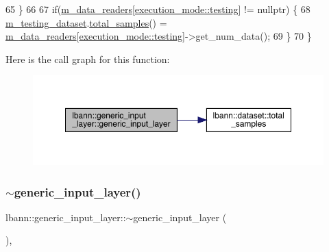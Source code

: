 \begin{DoxyCode}
65     \}
66 
67     \textcolor{keywordflow}{if}(\hyperlink{classlbann_1_1generic__input__layer_a6bc18860c02beed0252ea3cc87bc48d2}{m\_data\_readers}[\hyperlink{base_8hpp_a2781a159088df64ed7d47cc91c4dc0a8aae2b1fca515949e5d54fb22b8ed95575}{execution\_mode::testing}] != \textcolor{keyword}{nullptr}) \{
68       \hyperlink{classlbann_1_1generic__input__layer_a66b9ec6b393695232bd98edc62fc1348}{m\_testing\_dataset}.\hyperlink{classlbann_1_1dataset_ab951c879f151990613567e985fe1e278}{total\_samples}() = 
      \hyperlink{classlbann_1_1generic__input__layer_a6bc18860c02beed0252ea3cc87bc48d2}{m\_data\_readers}[\hyperlink{base_8hpp_a2781a159088df64ed7d47cc91c4dc0a8aae2b1fca515949e5d54fb22b8ed95575}{execution\_mode::testing}]->get\_num\_data();
69     \}
70   \}
\end{DoxyCode}
Here is the call graph for this function\+:\nopagebreak
\begin{figure}[H]
\begin{center}
\leavevmode
\includegraphics[width=350pt]{classlbann_1_1generic__input__layer_a0c7ce1625cd2be2368822c2662346538_cgraph}
\end{center}
\end{figure}
\mbox{\label{classlbann_1_1generic__input__layer_a09575a4120064a6882883b3a0ee11b7e}} 
\subsubsection{\texorpdfstring{$\sim$generic\+\_\+input\+\_\+layer()}{~generic\_input\_layer()}}
{\footnotesize\ttfamily lbann\+::generic\+\_\+input\+\_\+layer\+::$\sim$generic\+\_\+input\+\_\+layer (\begin{DoxyParamCaption}{ }\end{DoxyParamCaption})\hspace{0.3cm}{\ttfamily [inline]}, {\ttfamily [override]}}



